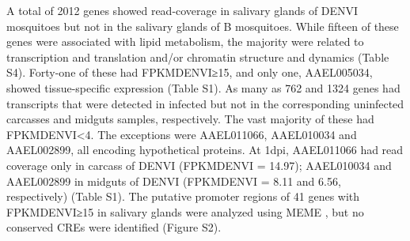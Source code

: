 A total of 2012 genes showed read-coverage in salivary glands of DENVI mosquitoes but not in the salivary glands of B mosquitoes.
While fifteen of these genes were associated with lipid metabolism, the majority were related to transcription and translation and/or chromatin structure and dynamics (Table S4).
Forty-one of these had FPKMDENVI≥15, and only one, AAEL005034, showed tissue-specific expression (Table S1).
As many as 762 and 1324 genes had transcripts that were detected in infected but not in the corresponding uninfected carcasses and midguts samples, respectively.
The vast majority of these had FPKMDENVI<4.
The exceptions were AAEL011066, AAEL010034 and AAEL002899, all encoding hypothetical proteins.
At 1dpi, AAEL011066 had read coverage only in carcass of DENVI (FPKMDENVI = 14.97); AAEL010034 and AAEL002899 in midguts of DENVI (FPKMDENVI = 8.11 and 6.56, respectively) (Table S1).
The putative promoter regions of 41 genes with FPKMDENVI≥15 in salivary glands were analyzed using MEME \cite{Bailey2006}, but no conserved CREs were identified (Figure S2).


